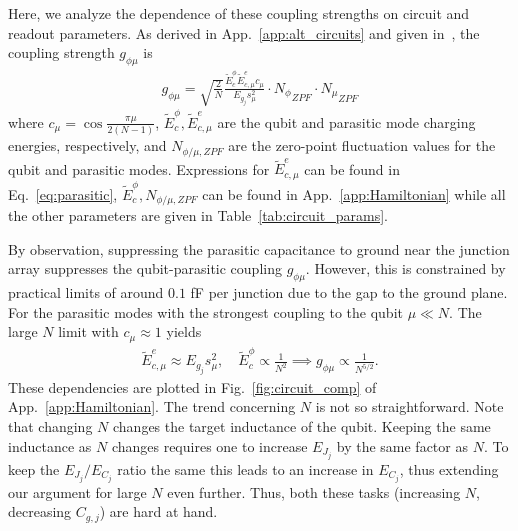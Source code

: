 \documentclass[%
reprint,
superscriptaddress,
 amsmath,amssymb,
 aps,
 prx,
longbibliography,
floatfix,
]{revtex4-2}
\begin{document}
Here, we analyze the dependence of these coupling strengths on circuit and readout parameters. As derived in App.~\ref{app:alt_circuits} and given in~\cite{viola2015collective}, the coupling strength $g_{\phi \mu}$ is
\begin{align}
g_{\phi\mu}=\sqrt{\frac{2}{N}} \frac{\tilde{E}^\phi_c\tilde{E}^e_{c,\mu}c_\mu}{E_{g_j}s_\mu^2}     \cdot {N_\phi}_{ZPF} \cdot {N_\mu}_{ZPF}
\end{align}
where $c_\mu=\cos{\frac{\pi\mu}{2(N-1)}}$, $\tilde{E}_c^\phi,\tilde{E}^e_{c,\mu} $ are the qubit and parasitic mode charging energies, respectively, and $N_{\phi/\mu,ZPF}$ are the zero-point fluctuation values for the qubit and parasitic modes. Expressions for $\tilde{E}^e_{c,\mu}$ can be found in Eq.~\ref{eq:parasitic}, $\tilde{E}_c^\phi,N_{\phi/\mu,ZPF}$ can be found in App.~\ref{app:Hamiltonian} while all the other parameters are given in Table~\ref{tab:circuit_params}. 

By observation, suppressing the parasitic capacitance to ground near the junction array suppresses the qubit-parasitic coupling $g_{\phi\mu}$. However, this is constrained by practical limits of around $0.1$ fF per junction due to the gap to the ground plane. For the parasitic modes with the strongest coupling to the qubit $\mu\ll N$. The large $N$ limit with $c_\mu\approx 1$ yields
\begin{align}
    \tilde{E}^e_{c,\mu}\approx E_{g_j}s_\mu^2, \quad \tilde{E}^\phi_c\propto \frac{1}{N^2}\implies g_{\phi\mu}\propto \frac{1}{N^{5/2}}.
\end{align}
 These dependencies are plotted in Fig.~\ref{fig:circuit_comp} of App.~\ref{app:Hamiltonian}. The trend concerning $N$ is not so straightforward.  Note that changing $N$ changes the target inductance of the qubit. Keeping the same inductance as $N$ changes requires one to increase $E_{J_j}$ by the same factor as $N$. To keep the $E_{J_j}/E_{C_j}$ ratio the same this leads to an increase in $E_{C_j}$, thus extending our argument for large $N$ even further. Thus, both these tasks (increasing $N$, decreasing $C_{g,j}$) are hard at hand.  
\end{document}
